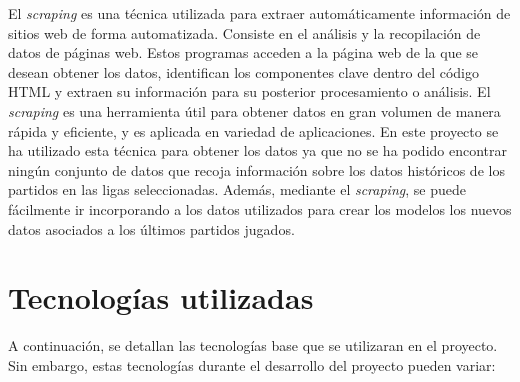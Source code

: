   El \textit{scraping} \cite{scraping} es una técnica utilizada para extraer automáticamente información de sitios web de forma automatizada. Consiste en el análisis y la recopilación de datos de páginas web. Estos programas acceden a la página web de la que se desean obtener los datos, identifican los componentes clave dentro del código HTML y extraen su información para su posterior procesamiento o análisis. El \textit{scraping} es una herramienta útil para obtener datos en gran volumen de manera rápida y eficiente, y es aplicada en variedad de aplicaciones. En este proyecto se ha utilizado esta técnica para obtener los datos ya que no se ha podido encontrar ningún conjunto de datos que recoja información sobre los datos históricos de los partidos en las ligas seleccionadas. Además, mediante el \textit{scraping}, se puede fácilmente ir incorporando a los datos utilizados para crear los modelos los nuevos datos asociados a los últimos partidos jugados.
  

  \section{Tecnologías utilizadas}

  A continuación, se detallan las tecnologías base que se utilizaran en el proyecto. Sin embargo, estas tecnologías durante el desarrollo del proyecto pueden variar:



